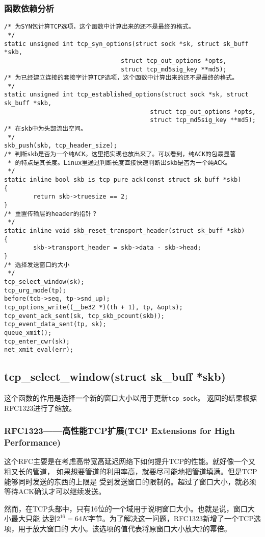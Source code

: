 \subsubsection{函数依赖分析}

\begin{verbatim}
/* 为SYN包计算TCP选项，这个函数中计算出来的还不是最终的格式。
 */
static unsigned int tcp_syn_options(struct sock *sk, struct sk_buff *skb,
                                struct tcp_out_options *opts,
                                struct tcp_md5sig_key **md5);
/* 为已经建立连接的套接字计算TCP选项，这个函数中计算出来的还不是最终的格式。
 */
static unsigned int tcp_established_options(struct sock *sk, struct sk_buff *skb,
                                        struct tcp_out_options *opts,
                                        struct tcp_md5sig_key **md5);
/* 在skb中为头部流出空间。
 */
skb_push(skb, tcp_header_size);
/* 判断skb是否为一个纯ACK。这里把实现也放出来了。可以看到，纯ACK的包最显著
 * 的特点是其长度。Linux里通过判断长度直接快速判断出skb是否为一个纯ACK。
 */
static inline bool skb_is_tcp_pure_ack(const struct sk_buff *skb)
{
        return skb->truesize == 2;
}
/* 重置传输层的header的指针？
 */
static inline void skb_reset_transport_header(struct sk_buff *skb)
{
        skb->transport_header = skb->data - skb->head;
}
/* 选择发送窗口的大小
 */
tcp_select_window(sk);
tcp_urg_mode(tp);
before(tcb->seq, tp->snd_up);
tcp_options_write((__be32 *)(th + 1), tp, &opts);
tcp_event_ack_sent(sk, tcp_skb_pcount(skb));
tcp_event_data_sent(tp, sk);
queue_xmit();
tcp_enter_cwr(sk);
net_xmit_eval(err);
\end{verbatim}

\subsection{tcp\_select\_window(struct sk\_buff *skb)}
这个函数的作用是选择一个新的窗口大小以用于更新\texttt{tcp_sock}。
返回的结果根据RFC1323进行了缩放。

\subsubsection{RFC1323——高性能TCP扩展(TCP Extensions for High Performance)}
这个RFC主要是在考虑高带宽高延迟网络下如何提升TCP的性能。就好像一个又粗又长的管道，
如果想要管道的利用率高，就要尽可能地把管道填满。但是TCP能够同时发送的东西的上限是
受到发送窗口的限制的。超过了窗口大小，就必须等待ACK确认才可以继续发送。

然而，在TCP头部中，只有16位的一个域用于说明窗口大小。也就是说，窗口大小最大只能
达到$2^{16}=64K字节$。为了解决这一问题，RFC1323新增了一个TCP选项，用于放大窗口的
大小。该选项的值代表将原窗口大小放大2的幂倍。

